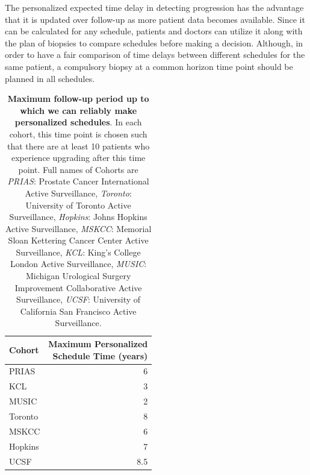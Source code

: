The personalized expected time delay in detecting progression has the advantage that it is updated over follow-up as more patient data becomes available. Since it can be calculated for any schedule, patients and doctors can utilize it along with the plan of biopsies to compare schedules before making a decision. Although, in order to have a fair comparison of time delays between different schedules for the same patient, a compulsory biopsy at a common horizon time point should be planned in all schedules.

\begin{table}[!htb]
\small\sf\centering
\caption{\textbf{Maximum follow-up period up to which we can reliably make personalized schedules}. In each cohort, this time point is chosen such that there are at least 10 patients who experience upgrading after this time point. Full names of Cohorts are \textit{PRIAS}: Prostate Cancer International Active Surveillance, \textit{Toronto}: University of Toronto Active Surveillance, \textit{Hopkins}: Johns Hopkins Active Surveillance, \textit{MSKCC}: Memorial Sloan Kettering Cancer Center Active Surveillance, \textit{KCL}: King's College London Active Surveillance, \textit{MUSIC}: Michigan Urological Surgery Improvement Collaborative Active Surveillance, \textit{UCSF}: University of California San Francisco Active Surveillance.}
\label{tab:max_pred_time_repeat}
\begin{tabular}{l|r}
\hline
\hline
Cohort & \parbox[t]{3.75cm}{Maximum Personalized\\Schedule Time (years)}\\
\hline
PRIAS & 6\\
KCL & 3\\
MUSIC & 2\\
Toronto & 8\\
MSKCC & 6\\
Hopkins & 7\\
UCSF & 8.5\\
\hline
\end{tabular}	
\end{table}

